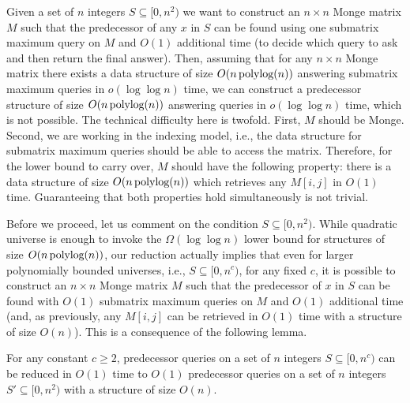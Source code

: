 \documentclass{llncs}
\newcommand{\polylog}{\text{\,polylog}}
\begin{document}
Given a set of $n$ integers $S\subseteq [0,n^{2})$ we want to construct an $n\times n$ Monge matrix $M$ such that the predecessor of
any $x$ in $S$ can be found using one submatrix maximum query on $M$ and $O(1)$ additional time (to decide which query to ask
and then return the final answer). Then, assuming that for any $n\times n$ Monge matrix there exists a data structure of size $O(n\polylog(n))$
answering submatrix maximum queries in $o(\log\log n)$ time, we can construct a predecessor structure
of size $O(n\polylog(n))$ answering queries in $o(\log\log n)$ time, which is not possible.
The technical difficulty here is twofold. First, $M$ should be Monge. Second, we are working in the indexing model, i.e., the
data structure for submatrix maximum queries should be able to access the matrix. Therefore, for the lower bound to carry over, $M$ should have the following
property: there is a data structure of size $O(n\polylog(n))$ which retrieves any $M[i,j]$ in $O(1)$ time. Guaranteeing
that both properties hold simultaneously is not trivial. 

Before we proceed, let us comment on the condition $S\subseteq [0,n^{2})$. While quadratic universe is enough to invoke
the $\Omega(\log\log n)$ lower bound for structures of size
$O(n\polylog(n))$, our reduction actually implies  that even for larger
polynomially bounded universes, i.e., $S\subseteq [0,n^{c})$, for any
fixed $c$, it is possible to construct an $n\times n$ Monge matrix $M$
such that the predecessor of $x$ in $S$ can be found with $O(1)$ submatrix maximum queries on $M$ and $O(1)$
additional time (and, as previously, any $M[i,j]$ can be retrieved in
$O(1)$ time with a structure of size $O(n)$). This is a consequence of the following lemma. 


\begin{lemma}
\label{lem:universe reduction}
For any constant $c\geq 2$, predecessor queries on a set of $n$ integers $S\subseteq [0,n^{c})$ can be reduced in $O(1)$ time to $O(1)$
predecessor queries on a set of $n$ integers $S'\subseteq [0,n^{2})$ with a structure of size $O(n)$.
\end{lemma}
\end{document}
